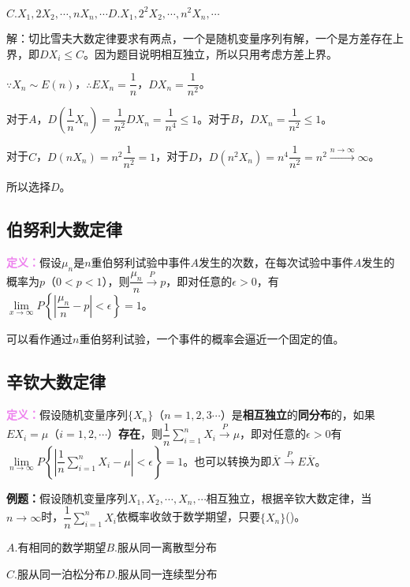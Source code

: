 \documentclass[UTF8, 12pt]{ctexart}
\begin{document}
$C.X_1,2X_2,\cdots,nX_n,\cdots$\qquad$D.X_1,2^2X_2,\cdots,n^2X_n,\cdots$

解：切比雪夫大数定律要求有两点，一个是随机变量序列有解，一个是方差存在上界，即$DX_i\leqslant C$。因为题目说明相互独立，所以只用考虑方差上界。

$\because X_n\sim E(n)$，$\therefore EX_n=\dfrac{1}{n}$，$DX_n=\dfrac{1}{n^2}$。

对于$A$，$D\left(\dfrac{1}{n}X_n\right)=\dfrac{1}{n^2}DX_n=\dfrac{1}{n^4}\leqslant1$。对于$B$，$DX_n=\dfrac{1}{n^2}\leqslant1$。

对于$C$，$D(nX_n)=n^2\dfrac{1}{n^2}=1$，对于$D$，$D(n^2X_n)=n^4\dfrac{1}{n^2}=n^2\overset{n\to\infty}{\longrightarrow}\infty$。

所以选择$D$。

\subsection{伯努利大数定律}

\textcolor{violet}{\textbf{定义：}}假设$\mu_n$是$n$重伯努利试验中事件$A$发生的次数，在每次试验中事件$A$发生的概率为$p$（$0<p<1$），则$\dfrac{\mu_n}{n}\overset{P}{\longrightarrow}p$，即对任意的$\epsilon>0$，有$\lim\limits_{x\to\infty}P\left\{\left\vert\dfrac{\mu_n}{n}-p\right\vert<\epsilon\right\}=1$。

可以看作通过$n$重伯努利试验，一个事件的概率会逼近一个固定的值。

\subsection{辛钦大数定律}

\textcolor{violet}{\textbf{定义：}}假设随机变量序列$\{X_n\}$（$n=1,2,3\cdots$）是\textbf{相互独立}的\textbf{同分布}的，如果$EX_i=\mu$（$i=1,2,\cdots$）\textbf{存在}，则$\dfrac{1}{n}\sum\limits_{i=1}^nX_i\overset{P}{\longrightarrow}\mu$，即对任意的$\epsilon>0$有$\lim\limits_{n\to\infty}P\left\{\left\vert\dfrac{1}{n}\sum\limits_{i=1}^nX_i-\mu\right\vert<\epsilon\right\}=1$。也可以转换为即$\overline{X}\overset{P}{\rightarrow}E\overline{X}$。\medskip

\textbf{例题：}假设随机变量序列$X_1,X_2,\cdots,X_n,\cdots$相互独立，根据辛钦大数定律，当$n\to\infty$时，$\dfrac{1}{n}\sum\limits_{i=1}^nX_i$依概率收敛于数学期望，只要$\{X_n\}$()。

$A.$有相同的数学期望\qquad$B.$服从同一离散型分布

$C.$服从同一泊松分布\qquad$D.$服从同一连续型分布
\end{document}
